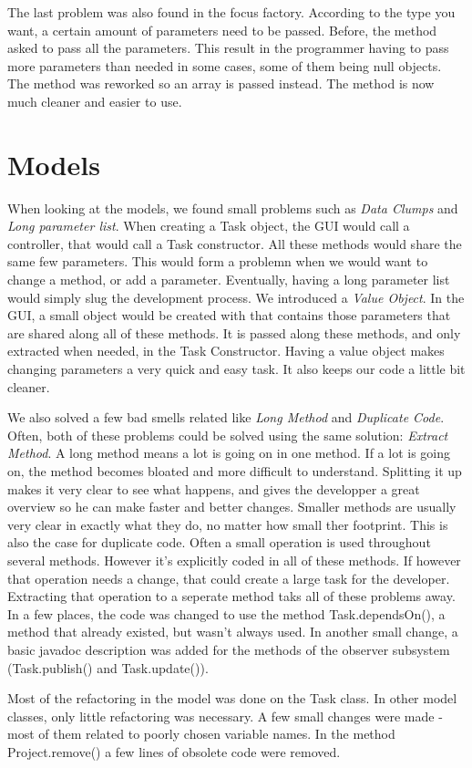 The last problem was also found in the focus factory. According to the type you want, a certain amount of parameters need to be passed. Before, the method asked to pass all the parameters. This result in the programmer having to pass more parameters than needed in some cases, some of them being null objects. The method was reworked so an array is passed instead. The method is now much cleaner and easier to use.

\section{Models}
When looking at the models, we found small problems such as \emph{Data Clumps}
and \emph{Long parameter list}.
When creating a Task object, the GUI would call a controller, that would call a
Task constructor. All these methods would
share the same few parameters.
This would form a problemn when we would want to change a method, or add a
parameter. Eventually, having a long parameter list would simply slug the
development process.
We introduced a \emph{Value Object}. In the GUI, a small object would be created
with that contains those parameters that are shared along all of these methods.
It is passed along these methods, and only extracted when needed, in the Task
Constructor.
Having a value object makes changing parameters a very quick and easy task. It
also keeps our code a little bit cleaner.

We also solved a few bad smells related like \emph{Long Method} and
\emph{Duplicate Code}. Often, both of these problems could be solved using the
same solution: \emph{Extract Method}.
A long method means a lot is going on in one method. If a lot is going on, the
method becomes bloated and more difficult to understand.
Splitting it up makes it very clear to see what happens, and gives the
developper a great overview so he can make faster and better changes.
Smaller methods are usually very clear in exactly what they do, no matter how
small ther footprint.
This is also the case for duplicate code. Often a small operation is used
throughout several methods. However it's explicitly coded in all of these
methods.
If however that operation needs a change, that could create a large task for the
developer.
Extracting that operation to a seperate method taks all of these problems away.
In a few places, the code was changed to use the method Task.dependsOn(), a method that already existed, but wasn't always used.
In another small change, a basic javadoc description was added for the methods of the observer subsystem (Task.publish() and Task.update()).


Most of the refactoring in the model was done on the Task class. In other model classes, only little refactoring was necessary. A few small changes were made - most of them related to poorly chosen variable names. 
In the method Project.remove() a few lines of obsolete code were removed.
